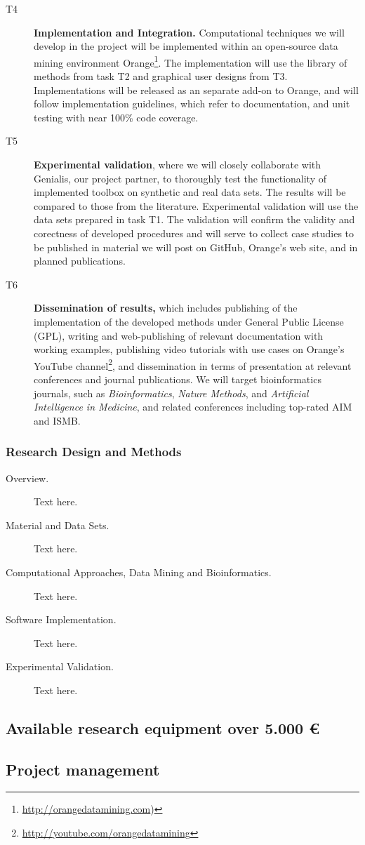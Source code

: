 \documentclass[11pt,a4paper]{article}
\renewcommand{\bold}{\textbf}
\begin{document}
\begin{description}
	\item[T4] \bold{Implementation and Integration.} Computational techniques we will develop in the project will be implemented within an open-source data mining environment Orange\footnote{\url{http://orangedatamining.com})}. The implementation will use the library of methods from task T2 and graphical user designs from T3. Implementations will be released as an separate add-on to Orange, and will follow implementation guidelines, which refer to documentation, and unit testing with near 100\% code coverage.
	\item[T5] \bold{Experimental validation}, where we will closely collaborate with Genialis, our project partner, to thoroughly test the functionality of implemented toolbox on synthetic and real data sets. The results will be compared to those from the literature. Experimental validation will use the data sets prepared in task T1. The validation will confirm the validity and corectness of developed procedures and will serve to collect case studies to be published in material we will post on GitHub, Orange's web site, and in planned publications.
	\item[T6] \bold{Dissemination of results,} which includes publishing of the implementation of the developed methods under General Public License (GPL), writing and web-publishing of relevant documentation with working examples, publishing video tutorials with use cases on Orange's YouTube channel\footnote{\url{http://youtube.com/orangedatamining}}, and dissemination in terms of presentation at relevant conferences and journal publications. We will target bioinformatics journals, such as {\em Bioinformatics}, {\em Nature Methods}, and {\em Artificial Intelligence in Medicine}, and related conferences including top-rated AIM and ISMB.
\end{description}

\subsubsection{Research Design and Methods}
\begin{description}
	\item[Overview.] Text here.
	\item[Material and Data Sets.] Text here.
	\item[Computational Approaches, Data Mining and Bioinformatics.] Text here.
	\item[Software Implementation.] Text here.
	\item[Experimental Validation.] Text here.
\end{description}

\subsection{Available research equipment over 5.000 €}

\subsection{Project management}
\end{document}
